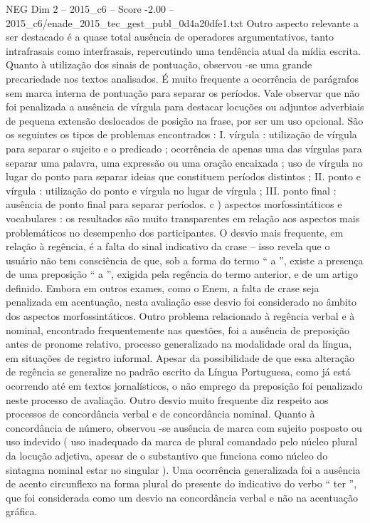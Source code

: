 \begin{textsample}{NEG Dim 2 – 2015\_c6 – Score -2.00 – 2015\_c6/enade\_2015\_tec\_gest\_publ\_0d4a20dfe1.txt}
Outro aspecto relevante a ser destacado é a quase total ausência de operadores argumentativos, tanto intrafrasais como interfrasais, repercutindo uma tendência atual da mídia escrita.
Quanto à utilização dos sinais de pontuação, observou -se uma grande precariedade nos textos analisados.
É muito frequente a ocorrência de parágrafos sem marca interna de pontuação para separar os períodos.
Vale observar que não foi penalizada a ausência de vírgula para destacar locuções ou adjuntos adverbiais de pequena extensão deslocados de posição na frase, por ser um uso opcional.
São os seguintes os tipos de problemas encontrados : I. vírgula : utilização de vírgula para separar o sujeito e o predicado ; ocorrência de apenas uma das vírgulas para separar uma palavra, uma expressão ou uma oração encaixada ; uso de vírgula no lugar do ponto para separar ideias que constituem períodos distintos ; II. ponto e vírgula : utilização do ponto e vírgula no lugar de vírgula ; III. ponto final : ausência de ponto final para separar períodos. c ) aspectos morfossintáticos e vocabulares : os resultados são muito transparentes em relação aos aspectos mais problemáticos no desempenho dos participantes.
O desvio mais frequente, em relação à regência, é a falta do sinal indicativo da crase – isso revela que o usuário não tem consciência de que, sob a forma do termo “ a ”, existe a presença de uma preposição “ a ”, exigida pela regência do termo anterior, e de um artigo definido.
Embora em outros exames, como o Enem, a falta de crase seja penalizada em acentuação, nesta avaliação esse desvio foi considerado no âmbito dos aspectos morfossintáticos.
Outro problema relacionado à regência verbal e à nominal, encontrado frequentemente nas questões, foi a ausência de preposição antes de pronome relativo, processo generalizado na modalidade oral da língua, em situações de registro informal.
Apesar da possibilidade de que essa alteração de regência se generalize no padrão escrito da Língua Portuguesa, como já está ocorrendo até em textos jornalísticos, o não emprego da preposição foi penalizado neste processo de avaliação.
Outro desvio muito frequente diz respeito aos processos de concordância verbal e de concordância nominal.
Quanto à concordância de número, observou -se ausência de marca com sujeito posposto ou uso indevido ( uso inadequado da marca de plural comandado pelo núcleo plural da locução adjetiva, apesar de o substantivo que funciona como núcleo do sintagma nominal estar no singular ).
Uma ocorrência generalizada foi a ausência de acento circunflexo na forma plural do presente do indicativo do verbo “ ter ”, que foi considerada como um desvio na concordância verbal e não na acentuação gráfica.

\end{textsample}
